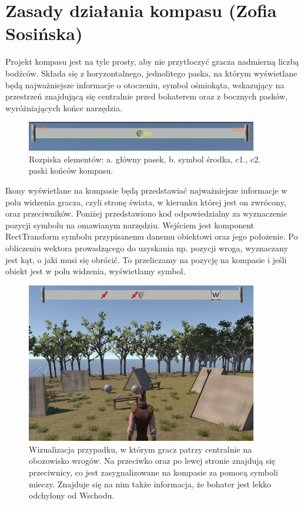 \section{Zasady działania kompasu (Zofia Sosińska)}\label{chap:naw}

Projekt kompasu jest na tyle prosty, aby nie przytłoczyć gracza nadmierną liczbą bodźców. Składa się z horyzontalnego, jednolitego paska, na którym wyświetlane będą najważniejsze informacje o otoczeniu, symbol ośmiokąta, wskazujący na przestrzeń znajdującą się centralnie przed bohaterem oraz z bocznych pasków, wyróżniających końce narzędzia.

\begin{figure}[htbp]
    \centering
    \includegraphics[width=0.9\textwidth]{images/ui/opis_ekementow_kompasu.png}
    \caption{Rozpiska elementów: a. główny pasek, b. symbol środka, c1., c2. paski końców kompasu.}\label{fig:compass_design}
\end{figure}

Ikony wyświetlane na kompasie będą przedstawiać najważniejsze informacje w polu widzenia gracza, czyli stronę świata, w kierunku której jest on zwrócony, oraz przeciwników.
Poniżej przedstawiono kod odpowiedzialny za wyznaczenie pozycji symbolu na omawianym narzędziu. Wejściem jest komponent RectTransform symbolu przypisanemu danemu obiektowi oraz jego położenie. Po obliczeniu wektora prowadzącego do uzyskania np. pozycji wroga, wyznaczany jest kąt, o jaki musi się obrócić. To przeliczamy na pozycję na kompasie i jeśli obiekt jest w polu widzenia, wyświetlamy symbol.

\begin{figure}[htbp]
    \centering
    \includegraphics[width=0.9\textwidth]{images/ui/compass.png}
    \caption{Wizualizacja przypadku, w którym gracz patrzy centralnie na obozowisko wrogów. Na przeciwko oraz po lewej stronie znajdują się przeciwnicy, co jest zasygnalizowane na kompasie za pomocą symboli mieczy. Znajduje się na nim także informacja, że bohater jest lekko odchylony od Wschodu.
    }\label{fig:compass}
\end{figure}

